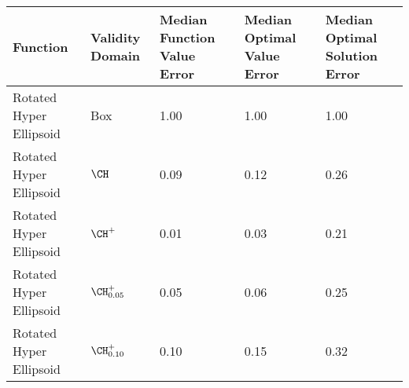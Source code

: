 \begin{table}[ht]
\centering
\begin{tabular}{lllll}
  \hline
Function & Validity Domain & Median Function Value Error & Median Optimal Value Error & Median Optimal Solution Error \\ 
  \hline
Rotated Hyper Ellipsoid & {\sc Box} & 1.00 & 1.00 & 1.00 \\ 
  Rotated Hyper Ellipsoid & $\CH$ & 0.09 & 0.12 & 0.26 \\ 
  Rotated Hyper Ellipsoid & $\CH^+$ & 0.01 & 0.03 & 0.21 \\ 
  Rotated Hyper Ellipsoid & $\CH^+_{0.05}$ & 0.05 & 0.06 & 0.25 \\ 
  Rotated Hyper Ellipsoid & $\CH^+_{0.10}$ & 0.10 & 0.15 & 0.32 \\ 
   \hline
\end{tabular}
\end{table}
